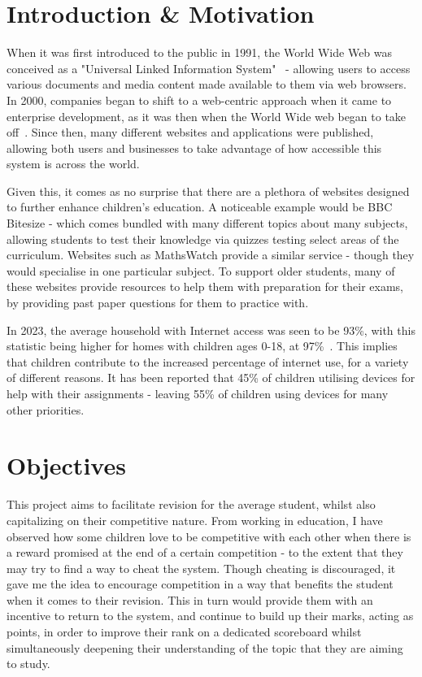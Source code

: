 \documentclass[]{final_report}
\begin{document}
\section{Introduction \& Motivation}

When it was first introduced to the public in 1991, the World Wide Web was conceived as a "Universal Linked Information System"~\cite{TBL_WWW} - allowing users to access various documents and media content made available to them via web browsers. In 2000, companies began to shift to a web-centric approach when it came to enterprise development, as it was then when the World Wide web began to take off~\cite{MODERN_WEB}. Since then, many different websites and applications were published, allowing both users and businesses to take advantage of how accessible this system is across the world.

Given this, it comes as no surprise that there are a plethora of websites designed to further enhance children's education. A noticeable example would be BBC Bitesize - which comes bundled with many different topics about many subjects, allowing students to test their knowledge via quizzes testing select areas of the curriculum. Websites such as MathsWatch provide a similar service - though they would specialise in one particular subject. To support older students, many of these websites provide resources to help them with preparation for their exams, by providing past paper questions for them to practice with.

In 2023, the average household with Internet access was seen to be 93\%, with this statistic being higher for homes with children ages 0-18, at 97\%~\cite{INTERNET_USERS}. This implies that children contribute to the increased percentage of internet use, for a variety of different reasons. It has been reported that 45\% of children utilising devices for help with their assignments\cite{DEVICE_REPORT} - leaving 55\% of children using devices for many other priorities.

\section{Objectives}
This project aims to facilitate revision for the average student, whilst also capitalizing on their competitive nature.  From working in education, I have observed how some children love to be competitive with each other when there is a reward promised at the end of a certain competition - to the extent that they may try to find a way to cheat the system. Though cheating is discouraged, it gave me the idea to encourage competition in a way that benefits the student when it comes to their revision. This in turn would provide them with an incentive to return to the system, and continue to build up their marks, acting as points, in order to improve their rank on a dedicated scoreboard whilst simultaneously deepening their understanding of the topic that they are aiming to study.
\end{document}
